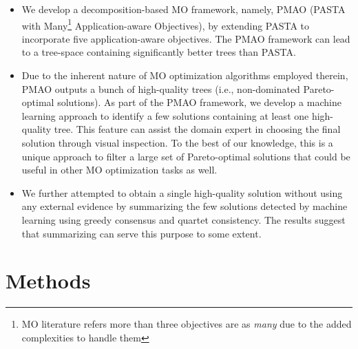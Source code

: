\begin{itemize}
	\item We develop a decomposition-based MO framework, namely, PMAO (PASTA with Many\footnote{ MO literature refers more than three objectives are as \textit{many}\cite{li2015many} due to the added complexities to handle them} Application-aware Objectives), by extending PASTA to incorporate five application-aware objectives. The PMAO framework can lead to a tree-space containing significantly better trees than PASTA. 

	\item Due to the inherent nature of MO optimization algorithms employed therein, PMAO outputs a bunch of high-quality trees (i.e., non-dominated Pareto-optimal solutions). As part of the PMAO framework, we develop a machine learning approach to identify a few solutions containing at least one high-quality tree. This feature can assist the domain expert in choosing the final solution through visual inspection. To the best of our knowledge, this is a unique approach to filter a large set of Pareto-optimal solutions that could be useful in other MO optimization tasks as well. 
	
	\item We further attempted to obtain a single high-quality solution without using any external evidence by summarizing the few solutions detected by machine learning using greedy consensus and quartet consistency. The results suggest that summarizing can serve this purpose to some extent.
	


\end{itemize}
 \section{Methods}
\label{sec:method}



